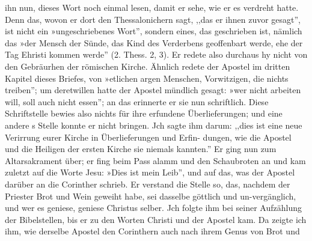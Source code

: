 ihn nun, dieses Wort noch einmal lesen, damit er sehe, wie er es
verdreht hatte. Denn das, wovon er dort den Thessalonichern
sagt, ,,das er ihnen zuvor gesagt'', ist nicht ein »ungeschriebenes
Wort'', sondern eines, das geschrieben ist, nämlich das »der Mensch
der Sünde, das Kind des Verderbens geoffenbart werde, ehe der Tag
Ehristi kommen werde'' (2. Thess. 2, 3). Er redete also durchaus
hy nicht von den Gebräurhen der römischen Kirche. Ähnlich redete
  der Apostel im dritten Kapitel dieses Briefes, von »etlichen argen
Menschen, Vorwitzigen, die nichts treiben''; um deretwillen hatte
der Apostel mündlich gesagt: »wer nicht arbeiten will, soll auch nicht
essen''; an das erinnerte er sie nun schriftlich. Diese Schriftstelle
bewies also nichts für ihre erfundene Überlieferungen; und eine andere s
Stelle konnte er nicht bringen. Jch sagte ihm darum: ,,dies ist
eine neue Verirrung eurer Kirche in Überlieferungen und Erfin-
dungen, wie die Apostel und die Heiligen der ersten Kirche sie
niemals kannten.''
Er ging nun zum Altarsakrament über; er fing beim Pass alamm
und den Schaubroten an und kam zuletzt auf die Worte Jesu:
»Dies ist mein Leib'', und auf das, was der Apostel darüber an
die Corinther schrieb. Er verstand die Stelle so, das, nachdem der
Priester Brot und Wein geweiht habe, sei dasselbe göttlich und
un-vergänglich, und wer es geniese, geniese Christus selber. Jch
folgte ihm bei seiner Aufzählung der Bibelstellen, bis er zu den
Worten Christi und der Apostel kam. Da zeigte ich ihm, wie
derselbe Apostel den Corinthern auch nach ihrem Genus von Brot und


